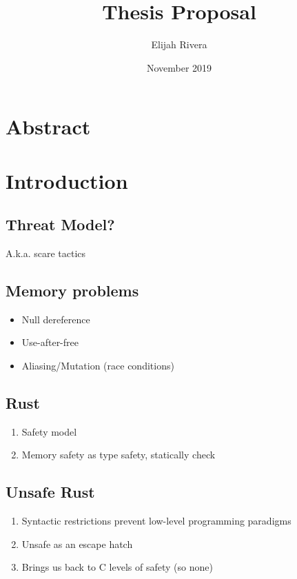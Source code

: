 \documentclass{article}
\title{Thesis Proposal}
\author{Elijah Rivera}
\date{November 2019}
\begin{document}
\maketitle

\section{Abstract}

\section{Introduction}

\subsection{Threat Model?}
A.k.a. scare tactics

\subsection{Memory problems}
\begin{itemize}
    \item Null dereference
    \item Use-after-free
    \item Aliasing/Mutation (race conditions)
\end{itemize}

\subsection{Rust}
\begin{enumerate}
    \item Safety model
    \item Memory safety as type safety, statically check
\end{enumerate}

\subsection{Unsafe Rust}
\begin{enumerate}
    \item Syntactic restrictions prevent low-level programming paradigms
    \item Unsafe as an escape hatch
    \item Brings us back to C levels of safety (so none)
\end{enumerate}
\end{document}
